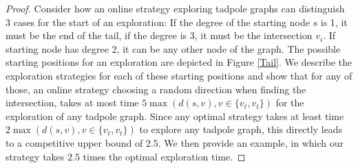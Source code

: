\begin{proof} Consider how an online strategy exploring tadpole graphs can distinguish 3 cases for the start of an exploration: If the degree of the starting node $s$ is 1,
    it must be the end of the tail, if the degree is 3, it must be the intersection $v_i$. If starting node has degree 2, it can be any other node of the graph.
    The possible starting positions for an exploration are depicted in Figure \ref{Tail}.
    We describe the exploration strategies for each of these starting positions and show that for any of those, an online strategy choosing
    a random direction when finding the intersection, takes at most time $5\max(d(s,v), v\in \{v_\ell, v_t\})$ for the exploration of any tadpole graph. 
    Since any optimal strategy takes at least time $2\max(d(s,v), v\in \{v_\ell, v_t\})$ to explore any tadpole graph, this directly leads to a competitive
    upper bound of $2.5$. We then provide an example, in which our strategy takes $2.5$ times the optimal exploration time.


\end{proof}
